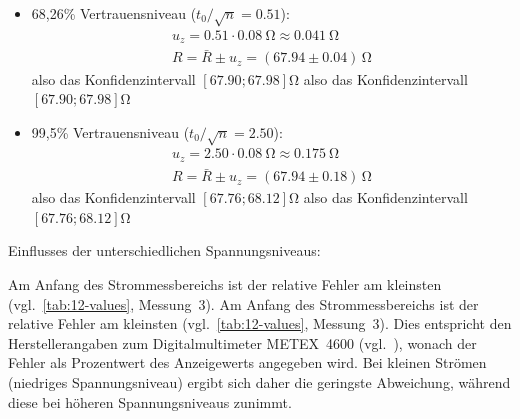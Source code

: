 \begin{itemize}
	\item 68,26\% Vertrauensniveau ($t_{0}/\sqrt{n} = 0.51$):
	      \[
		      \begin{gathered}
			      u_{z} = 0.51 \cdot \SI{0.08}{\ohm} \approx \SI{0.041}{\ohm} \\
			      R = \bar{R} \pm u_{z} = (67.94 \pm 0.04) \, \si{\ohm}
		      \end{gathered}
	      \]
	      also das Konfidenzintervall $[67.90; 67.98]\si{\ohm}$
	      also das Konfidenzintervall $[67.90; 67.98]\si{\ohm}$

	\item 99,5\% Vertrauensniveau ($t_{0}/\sqrt{n} = 2.50$):
	      \[
		      \begin{gathered}
			      u_{z} = 2.50 \cdot \SI{0.08}{\ohm} \approx \SI{0.175}{\ohm} \\
			      R = \bar{R} \pm u_{z} = (67.94 \pm 0.18) \, \si{\ohm}
		      \end{gathered}
	      \]
	      also das Konfidenzintervall $[67.76; 68.12]\si{\ohm}$
	      also das Konfidenzintervall $[67.76; 68.12]\si{\ohm}$
\end{itemize}

\marginref{\ref{itm:1-P2-4}}
Einflusses der unterschiedlichen Spannungsniveaus:

Am Anfang des Strommessbereichs ist der relative Fehler am kleinsten (vgl.~\autoref{tab:12-values}, Messung~3).
Am Anfang des Strommessbereichs ist der relative Fehler am kleinsten (vgl.~\autoref{tab:12-values}, Messung~3).
Dies entspricht den Herstellerangaben zum Digitalmultimeter METEX~4600
(vgl.~\cite[S.~143]{EMTPraktikum2025}), wonach der Fehler als Prozentwert des Anzeigewerts
angegeben wird. Bei kleinen Strömen (niedriges Spannungsniveau) ergibt sich daher die
geringste Abweichung, während diese bei höheren Spannungsniveaus zunimmt.

